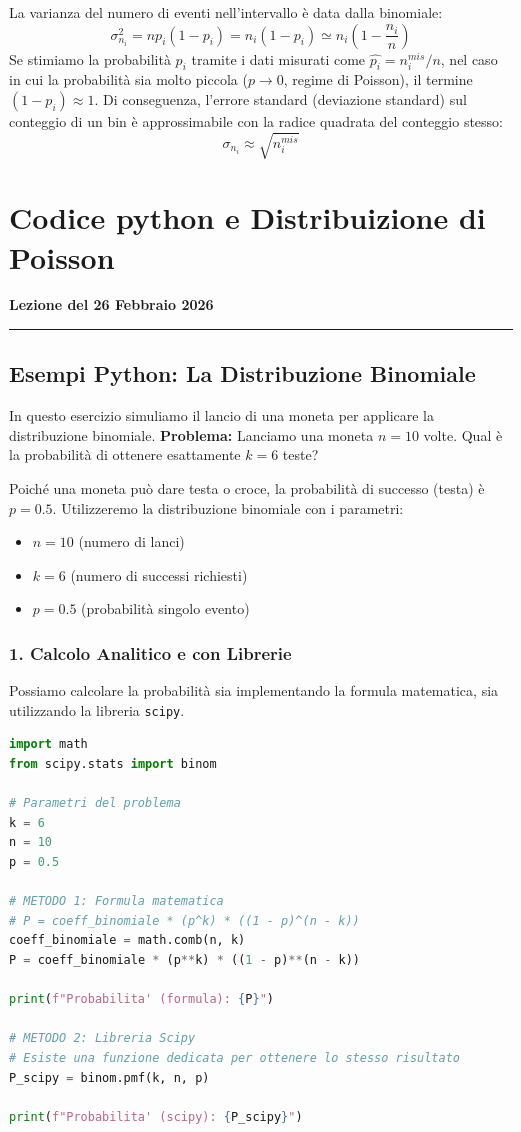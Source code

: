 \documentclass{article}
\theoremstyle{remark}
\newcommand{\thelezione}{}
\newcommand{\lezione}[2]{
\newpage
\renewcommand{\thelezione}{#2} 
\section{#1} 
\noindent\textbf{\color{RoyalBlue}Lezione del #2}\par\vspace{0.5em}\hrule\vspace{1em}
}
\begin{document}
La varianza del numero di eventi nell'intervallo è data dalla binomiale:
\[ \sigma_{n_i}^2 = n p_i (1 - p_i) = n_i (1 - p_i) \simeq n_i \left(1 - \frac{n_i}{n}\right) \]
Se stimiamo la probabilità $p_i$ tramite i dati misurati come $\hat{p_i} = n_i^{mis}/n$, nel caso in cui la probabilità sia molto piccola ($p \to 0$, regime di Poisson), il termine $(1-p_i) \approx 1$.
Di conseguenza, l'errore standard (deviazione standard) sul conteggio di un bin è approssimabile con la radice quadrata del conteggio stesso:
\[ \sigma_{n_i} \approx \sqrt{n_i^{mis}} \]

\lezione{Codice python e Distribuizione di Poisson}{26 Febbraio 2026}

\subsection{Esempi Python: La Distribuzione Binomiale}

In questo esercizio simuliamo il lancio di una moneta per applicare la distribuzione binomiale.
\textbf{Problema:} Lanciamo una moneta $n=10$ volte. Qual è la probabilità di ottenere esattamente $k=6$ teste?

Poiché una moneta può dare testa o croce, la probabilità di successo (testa) è $p=0.5$. Utilizzeremo la distribuzione binomiale con i parametri:
\begin{itemize}
    \item $n = 10$ (numero di lanci)
    \item $k = 6$ (numero di successi richiesti)
    \item $p = 0.5$ (probabilità singolo evento)
\end{itemize}

\subsubsection*{1. Calcolo Analitico e con Librerie}
Possiamo calcolare la probabilità sia implementando la formula matematica, sia utilizzando la libreria \texttt{scipy}.

\begin{lstlisting}[language=Python, frame=single, caption=Calcolo probabilità Binomiale]
import math
from scipy.stats import binom

# Parametri del problema
k = 6
n = 10
p = 0.5

# METODO 1: Formula matematica
# P = coeff_binomiale * (p^k) * ((1 - p)^(n - k))
coeff_binomiale = math.comb(n, k)
P = coeff_binomiale * (p**k) * ((1 - p)**(n - k))

print(f"Probabilita' (formula): {P}")

# METODO 2: Libreria Scipy
# Esiste una funzione dedicata per ottenere lo stesso risultato
P_scipy = binom.pmf(k, n, p)

print(f"Probabilita' (scipy): {P_scipy}")
\end{lstlisting}
\end{document}
